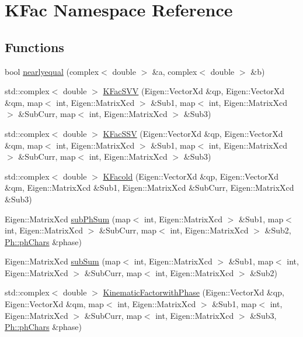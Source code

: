 \hypertarget{namespaceKFac}{}\section{K\+Fac Namespace Reference}
\label{namespaceKFac}
\subsection*{Functions}
\begin{DoxyCompactItemize}
\item 
bool \mbox{\hyperlink{namespaceKFac_a07acf360038cc03b8c6bd73f6724a7f5}{nearlyequal}} (complex$<$ double $>$ \&a, complex$<$ double $>$ \&b)
\item 
std\+::complex$<$ double $>$ \mbox{\hyperlink{namespaceKFac_a02b5c2876eea15ce628ac7cc58a4b746}{K\+Fac\+S\+VV}} (Eigen\+::\+Vector\+Xd \&qp, Eigen\+::\+Vector\+Xd \&qm, map$<$ int, Eigen\+::\+Matrix\+Xcd $>$ \&Sub1, map$<$ int, Eigen\+::\+Matrix\+Xcd $>$ \&Sub\+Curr, map$<$ int, Eigen\+::\+Matrix\+Xcd $>$ \&Sub3)
\item 
std\+::complex$<$ double $>$ \mbox{\hyperlink{namespaceKFac_a4cb65a4089c62e25d5511e2711fed59d}{K\+Fac\+S\+SV}} (Eigen\+::\+Vector\+Xd \&qp, Eigen\+::\+Vector\+Xd \&qm, map$<$ int, Eigen\+::\+Matrix\+Xcd $>$ \&Sub1, map$<$ int, Eigen\+::\+Matrix\+Xcd $>$ \&Sub\+Curr, map$<$ int, Eigen\+::\+Matrix\+Xcd $>$ \&Sub3)
\item 
std\+::complex$<$ double $>$ \mbox{\hyperlink{namespaceKFac_a3226cfdfe24c39b0713ca6ede04de295}{K\+Facold}} (Eigen\+::\+Vector\+Xd \&qp, Eigen\+::\+Vector\+Xd \&qm, Eigen\+::\+Matrix\+Xcd \&Sub1, Eigen\+::\+Matrix\+Xcd \&Sub\+Curr, Eigen\+::\+Matrix\+Xcd \&Sub3)
\item 
Eigen\+::\+Matrix\+Xcd \mbox{\hyperlink{namespaceKFac_ac23a25c1e9762e3c46e69835193075df}{sub\+Ph\+Sum}} (map$<$ int, Eigen\+::\+Matrix\+Xcd $>$ \&Sub1, map$<$ int, Eigen\+::\+Matrix\+Xcd $>$ \&Sub\+Curr, map$<$ int, Eigen\+::\+Matrix\+Xcd $>$ \&Sub2, \mbox{\hyperlink{structPh_1_1phChars}{Ph\+::ph\+Chars}} \&phase)
\item 
Eigen\+::\+Matrix\+Xcd \mbox{\hyperlink{namespaceKFac_a3eefd3c3b1834112b9b76444ef00895e}{sub\+Sum}} (map$<$ int, Eigen\+::\+Matrix\+Xcd $>$ \&Sub1, map$<$ int, Eigen\+::\+Matrix\+Xcd $>$ \&Sub\+Curr, map$<$ int, Eigen\+::\+Matrix\+Xcd $>$ \&Sub2)
\item 
std\+::complex$<$ double $>$ \mbox{\hyperlink{namespaceKFac_ac10b1bd8db1661c292e327a3eabcebb9}{Kinematic\+Factorwith\+Phase}} (Eigen\+::\+Vector\+Xd \&qp, Eigen\+::\+Vector\+Xd \&qm, map$<$ int, Eigen\+::\+Matrix\+Xcd $>$ \&Sub1, map$<$ int, Eigen\+::\+Matrix\+Xcd $>$ \&Sub\+Curr, map$<$ int, Eigen\+::\+Matrix\+Xcd $>$ \&Sub3, \mbox{\hyperlink{structPh_1_1phChars}{Ph\+::ph\+Chars}} \&phase)

\end{DoxyCompactItemize}
